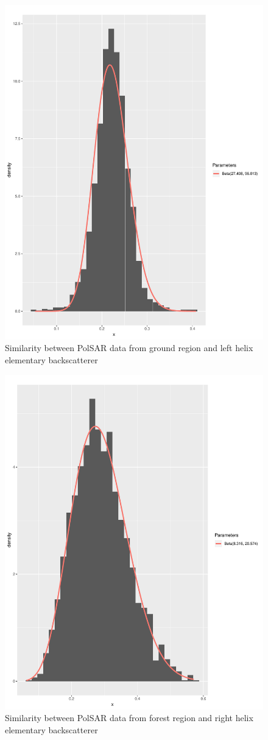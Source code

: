 \documentclass[conference]{IEEEtran}
\begin{document}
\begin{figure}[!ht]
    \centering
    \includegraphics[width = .9\linewidth, height = .7\linewidth]{../../../Figures/paper_19_05/lh_ground.pdf}
    \caption{Similarity between PolSAR data from ground region and left helix elementary backscatterer}
    \label{fig:gr_lh}
\end{figure}

\begin{figure}[!ht]
    \centering
    \includegraphics[width = .9\linewidth, height = .7\linewidth]{../../../Figures/paper_19_05/rh_vegetation.pdf}
    \caption{Similarity between PolSAR data from forest region and right helix elementary backscatterer}
    \label{fig:fr_rh}
\end{figure}
\end{document}
